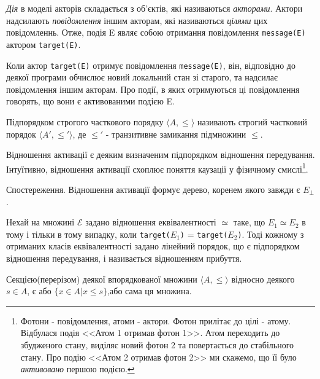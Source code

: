 \documentclass[12pt]{article}
\begin{document}
\textit{Дія} в моделі акторів складається з об'єктів, які називаються \textit{акторами}. Актори надсилають \textit{повідомлення} іншим акторам, які називаються \textit{цілями} цих повідомленнь. Отже, подія E являє собою отримання повідомлення \texttt{message(E)} актором \texttt{target(E)}.

Коли актор \texttt{target(E)} отримує повідомлення \texttt{message(E)}, він, відповідно до деякої програми обчислює новий локальний стан зі старого, та надсилає повідомлення іншим акторам. Про події, в яких отримуються ці повідомлення говорять, що вони є активованими подією E.

\begin{definition}[Підпорядок]
Підпорядком строгого часткового порядку $\langle A, \leq\rangle$ називають строгий частковий порядок $\langle A', \leq'\rangle$, де $\leq'$ - транзитивне замикання підмножини $\leq$.
\end{definition}

\begin{definition}
Відношення активації є деяким визначеним підпорядком відношення передування. Інтуїтивно, відношення активації схоплює поняття каузації у фізичному смислі\footnote{Фотони - повідомлення, атоми - актори. Фотон прилітає до цілі - атому. Відбулася подія <<Атом 1 отримав фотон 1>>. Атом переходить до збудженого стану, виділяє новий фотон 2 та повертається до стабільного стану. Про подію <<Атом 2 отримав фотон 2>> ми скажемо, що її було \textit{активовано} першою подією.}.
\end{definition}

\begin{corollary}
Спостереження. Відношення активації формує дерево, коренем якого завжди є $E_{\bot}$.
\end{corollary}

\begin{definition}
Нехай на множині $\mathcal{E}$ задано відношення еквівалентності $\simeq$ таке, що $E_1 \simeq E_2$ в тому і тільки в тому випадку, коли \texttt{target($E_1$)} = \texttt{target($E_2$)}. 
Тоді кожному з отриманих класів еквівалентності задано лінейний порядок, що є підпорядком відношення передування, і називається відношенням прибуття.
\end{definition}

\begin{definition}[Секція]
Секцією(перерізом) деякої впорядкованої множини $\langle A, \leq\rangle$ відносно деякого $s \in A$, є або $\{x \in A | x \leq s \}$,або сама ця множина.
\end{definition}
\end{document}
